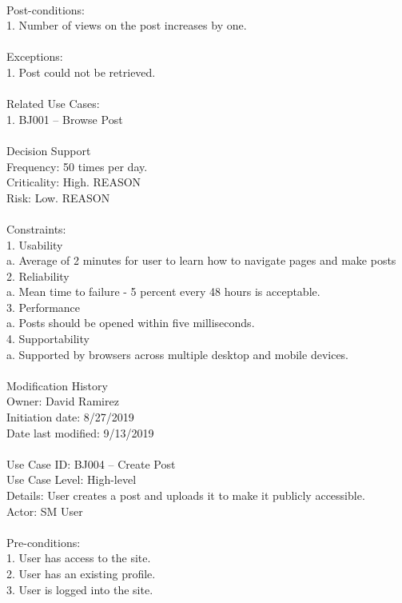 \documentclass{report}
\begin{document}
\\
Post-conditions: \\
1.	Number of views on the post increases by one.\\
\\
Exceptions: \\
1.	Post could not be retrieved.\\
\\
Related Use Cases: \\
1.	BJ001 – Browse Post\\
\\
Decision Support\\
     Frequency: 50 times per day.\\
     Criticality: High. REASON\\
     Risk: Low. REASON\\
\\
Constraints:\\
1.	Usability\\
	a.	Average of 2 minutes for user to learn how to navigate pages and make posts\\
2.	Reliability\\
	a.	Mean time to failure - 5 percent every 48 hours is acceptable.\\
3.	Performance\\
	a.	Posts should be opened within five milliseconds.\\
4.	Supportability\\
	a.	Supported by browsers across multiple desktop and mobile devices.\\
\\
Modification History\\
     Owner: David Ramirez\\
     Initiation date: 8/27/2019\\
     Date last modified: 9/13/2019\\
\\
Use Case ID: BJ004 – Create Post\\
Use Case Level: High-level\\
Details: User creates a post and uploads it to make it publicly accessible.\\
Actor: SM User\\
\\
Pre-conditions: \\
1.	User has access to the site.\\
2.	User has an existing profile.\\
3.	User is logged into the site.\\
\end{document}
